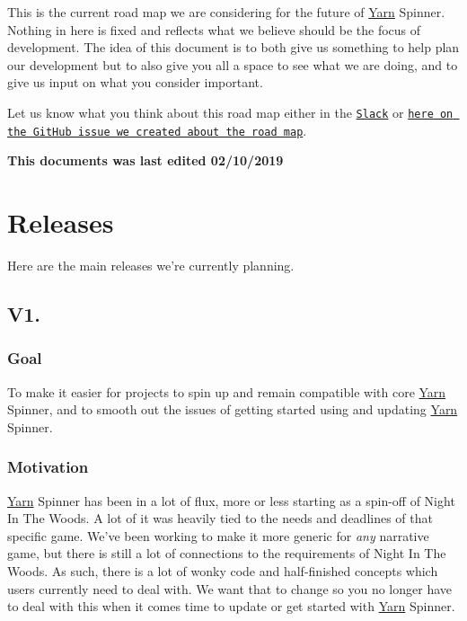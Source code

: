 This is the current road map we are considering for the future of \hyperlink{a00050}{Yarn} Spinner. Nothing in here is fixed and reflects what we believe should be the focus of development. The idea of this document is to both give us something to help plan our development but to also give you all a space to see what we are doing, and to give us input on what you consider important.

Let us know what you think about this road map either in the \href{http://lab.to/narrativegamedev}{\tt Slack} or \href{https://github.com/YarnSpinnerTool/YarnSpinner/issues/183}{\tt here on the Git\-Hub issue we created about the road map}.

{\bfseries This documents was last edited 02/10/2019}

\section*{Releases}

Here are the main releases we're currently planning.

\subsection*{V1.}

\subsubsection*{Goal}

To make it easier for projects to spin up and remain compatible with core \hyperlink{a00050}{Yarn} Spinner, and to smooth out the issues of getting started using and updating \hyperlink{a00050}{Yarn} Spinner.

\subsubsection*{Motivation}

\hyperlink{a00050}{Yarn} Spinner has been in a lot of flux, more or less starting as a spin-\/off of Night In The Woods. A lot of it was heavily tied to the needs and deadlines of that specific game. We've been working to make it more generic for {\itshape any} narrative game, but there is still a lot of connections to the requirements of Night In The Woods. As such, there is a lot of wonky code and half-\/finished concepts which users currently need to deal with. We want that to change so you no longer have to deal with this when it comes time to update or get started with \hyperlink{a00050}{Yarn} Spinner.

